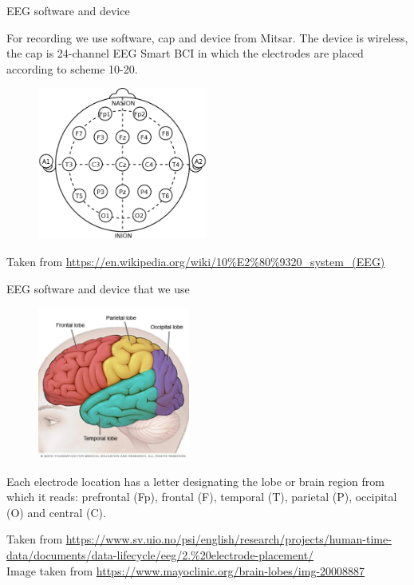 \documentclass{beamer}
\begin{document}
\begin{frame}
{\centerline{EEG software and device}}
    For recording we use software, cap and device from Mitsar. The device is wireless, the cap is 24-channel EEG Smart BCI in which the electrodes are placed according to scheme 10-20.
    \begin{figure}
        \centering
        \includegraphics[height=5cm]{P2023.AIBCCSS.BrainSignals/10-20 scheme.png}
    \end{figure}
    \begin{center}
    \tiny{Taken from \url{https://en.wikipedia.org/wiki/10\%E2\%80\%9320_system_(EEG)}}
    \end{center}  
\end{frame}

\begin{frame}
{\centerline{EEG software and device that we use}}
\begin{figure}
    \centering
    \includegraphics[height=5cm]{P2023.AIBCCSS.BrainSignals/brain_lobes.jpg}
\end{figure}
Each electrode location has a letter designating the lobe or brain region from which it reads: prefrontal (Fp), frontal (F), temporal (T), parietal (P), occipital (O) and central (C).
\begin{center}
    \tiny{Taken from \url{https://www.sv.uio.no/psi/english/research/projects/human-time-data/documents/data-lifecycle/eeg/2.\%20electrode-placement/}}\\
    \tiny{Image taken from \url{https://www.mayoclinic.org/brain-lobes/img-20008887}}
\end{center}
\end{frame}
\end{document}
